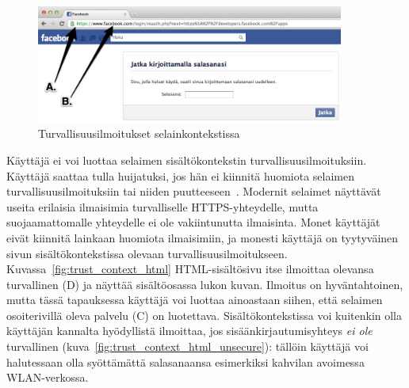 \documentclass[finnish,gradu]{tktltiki}
\begin{document}
  \begin{figure}
    \centering
    \includegraphics[width=0.9\textwidth]{images/Facebook_reauth_ab.jpg}
    \caption{Turvallisuusilmoitukset selainkontekstissa}
    \label{fig:facebook_reauth_ab}
  \end{figure}

  Käyttäjä ei voi luottaa selaimen sisältökontekstin turvallisuusilmoituksiin. Käyttäjä saattaa tulla huijatuksi, jos hän ei kiinnitä huomiota selaimen turvallisuusilmoituksiin tai niiden puutteeseen~\cite{why_phishing_works_06}. Modernit selaimet näyttävät useita erilaisia ilmaisimia turvalliselle HTTPS-yhteydelle, mutta suojaamattomalle yhteydelle ei ole vakiintunutta ilmaisinta. Monet käyttäjät eivät kiinnitä lainkaan huomiota ilmaisimiin, ja monesti käyttäjä on tyytyväinen sivun sisältökontekstissa olevaan turvallisuusilmoitukseen. Kuvassa~\ref{fig:trust_context_html} HTML-sisältösivu itse ilmoittaa olevansa turvallinen (D) ja näyttää sisältöosassa lukon kuvan. Ilmoitus on hyväntahtoinen, mutta tässä tapauksessa käyttäjä voi luottaa ainoastaan siihen, että selaimen osoiterivillä oleva palvelu (C) on luotettava. Sisältökontekstissa voi kuitenkin olla käyttäjän kannalta hyödyllistä ilmoittaa, jos sisäänkirjautumisyhteys \emph{ei ole} turvallinen (kuva~\ref{fig:trust_context_html_unsecure}): tällöin käyttäjä voi halutessaan olla syöttämättä salasanaansa esimerkiksi kahvilan avoimessa WLAN-verkossa.
\end{document}
